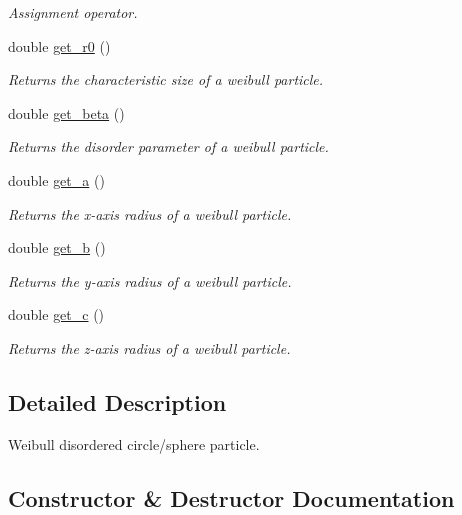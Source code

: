 \begin{DoxyCompactItemize}
\begin{DoxyCompactList}\small\item\em Assignment operator. \end{DoxyCompactList}\item 
double \hyperlink{classweibull_ae2cd75d0dde62b2b6bcf5d32ce7a1d35}{get\+\_\+r0} ()
\begin{DoxyCompactList}\small\item\em Returns the characteristic size of a weibull particle. \end{DoxyCompactList}\item 
double \hyperlink{classweibull_a4be488c64110666fd5392c4020e39408}{get\+\_\+beta} ()
\begin{DoxyCompactList}\small\item\em Returns the disorder parameter of a weibull particle. \end{DoxyCompactList}\item 
double \hyperlink{classweibull_ae044c77bbe28d60ed7849c2b9d92cb89}{get\+\_\+a} ()
\begin{DoxyCompactList}\small\item\em Returns the x-\/axis radius of a weibull particle. \end{DoxyCompactList}\item 
double \hyperlink{classweibull_a0bffa8d8bcfa247182986eda4758ecf3}{get\+\_\+b} ()
\begin{DoxyCompactList}\small\item\em Returns the y-\/axis radius of a weibull particle. \end{DoxyCompactList}\item 
double \hyperlink{classweibull_aac3f3540bbb0ba31028316df6f825446}{get\+\_\+c} ()
\begin{DoxyCompactList}\small\item\em Returns the z-\/axis radius of a weibull particle. \end{DoxyCompactList}\end{DoxyCompactItemize}


\subsection{Detailed Description}
Weibull disordered circle/sphere particle. 

\subsection{Constructor \& Destructor Documentation}
